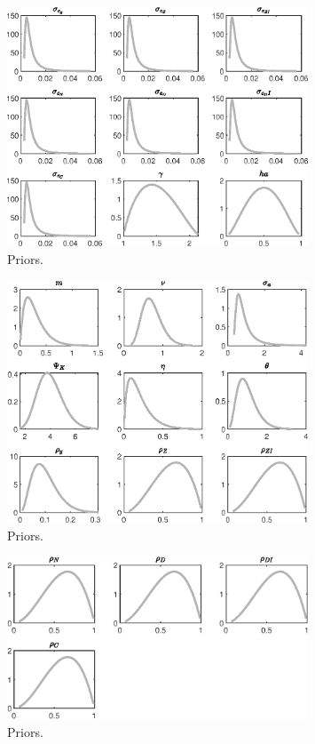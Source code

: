  
\begin{figure}[H]
\centering
\includegraphics[width=0.80\textwidth]{BRS_growth/graphs/BRS_growth_Priors1}
\caption{Priors.}\label{Fig:Priors:1}
\end{figure}
\begin{figure}[H]
\centering
\includegraphics[width=0.80\textwidth]{BRS_growth/graphs/BRS_growth_Priors2}
\caption{Priors.}\label{Fig:Priors:2}
\end{figure}
\begin{figure}[H]
\centering
\includegraphics[width=0.80\textwidth]{BRS_growth/graphs/BRS_growth_Priors3}
\caption{Priors.}\label{Fig:Priors:3}
\end{figure}
 
